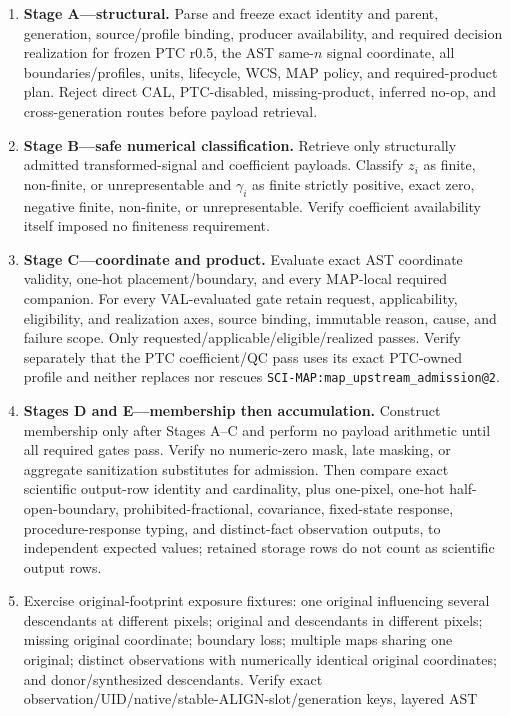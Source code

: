 \documentclass[10pt]{article}
\newcommand{\code}[1]{\nolinkurl{#1}}
\begin{document}
\begin{enumerate}
\item \textbf{Stage A---structural.} Parse and freeze exact identity and
parent, generation, source/profile binding, producer availability, and
required decision realization for frozen PTC r0.5, the AST same-\(n\) signal
coordinate, all boundaries/profiles, units, lifecycle, WCS, MAP policy, and
required-product plan. Reject direct CAL, PTC-disabled, missing-product,
inferred no-op, and cross-generation routes before payload retrieval.
\item \textbf{Stage B---safe numerical classification.} Retrieve only
structurally admitted transformed-signal and coefficient payloads. Classify
\(z_i\) as finite, non-finite, or unrepresentable and \(\gamma_i\) as finite
strictly positive, exact zero, negative finite, non-finite, or
unrepresentable. Verify coefficient availability itself imposed no finiteness
requirement.
\item \textbf{Stage C---coordinate and product.} Evaluate exact AST coordinate
validity, one-hot placement/boundary, and every MAP-local required companion.
For every VAL-evaluated gate retain request, applicability, eligibility, and
realization axes, source binding, immutable reason, cause, and failure scope.
Only requested/applicable/eligible/realized passes. Verify separately that the
PTC coefficient/QC pass uses its exact PTC-owned profile and neither replaces
nor rescues \code{SCI-MAP:map_upstream_admission@2}.
\item \textbf{Stages D and E---membership then accumulation.} Construct
membership only after Stages A--C and perform no payload arithmetic until all
required gates pass. Verify no numeric-zero mask, late masking, or aggregate
sanitization substitutes for admission. Then compare exact scientific
output-row identity and cardinality, plus
one-pixel, one-hot half-open-boundary, prohibited-fractional, covariance,
fixed-state response, procedure-response typing, and distinct-fact
observation outputs, to independent expected values; retained storage rows do
not count as scientific output rows.
\item Exercise original-footprint exposure fixtures: one original influencing
several descendants at different pixels; original and descendants in
different pixels; missing original coordinate; boundary loss; multiple maps
sharing one original; distinct observations with numerically identical
original coordinates; and donor/synthesized descendants. Verify exact
observation/UID/native/stable-ALIGN-slot/generation keys, layered AST

\end{enumerate}
\end{document}
